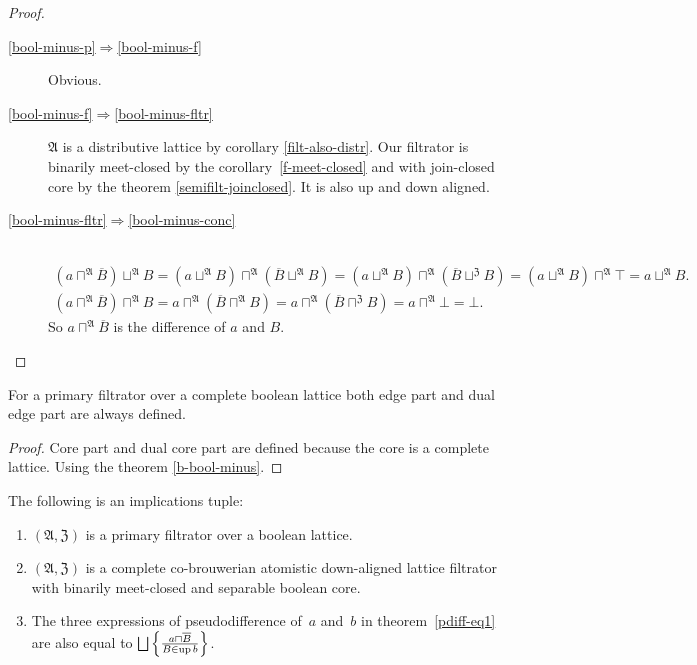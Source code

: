 \begin{proof}
~
\begin{description}
\item [{\ref{bool-minus-p}$\Rightarrow$\ref{bool-minus-f}}] Obvious.
\item [{\ref{bool-minus-f}$\Rightarrow$\ref{bool-minus-fltr}}] $\mathfrak{A}$
is a distributive lattice by corollary \ref{filt-also-distr}. Our
filtrator is binarily meet-closed by the corollary~\ref{f-meet-closed}
and with join-closed core by the theorem \ref{semifilt-joinclosed}.
It is also up and down aligned.
\item [{\ref{bool-minus-fltr}$\Rightarrow$\ref{bool-minus-conc}}] ~
\begin{gather*}
(a\sqcap^{\mathfrak{A}}\overline{B})\sqcup^{\mathfrak{A}}B=(a\sqcup^{\mathfrak{A}}B)\sqcap^{\mathfrak{A}}(\overline{B}\sqcup^{\mathfrak{A}}B)=(a\sqcup^{\mathfrak{A}}B)\sqcap^{\mathfrak{A}}(\overline{B}\sqcup^{\mathfrak{Z}}B)=(a\sqcup^{\mathfrak{A}}B)\sqcap^{\mathfrak{A}}\top=a\sqcup^{\mathfrak{A}}B.\\
(a\sqcap^{\mathfrak{A}}\overline{B})\sqcap^{\mathfrak{A}}B=a\sqcap^{\mathfrak{A}}(\overline{B}\sqcap^{\mathfrak{A}}B)=a\sqcap^{\mathfrak{A}}(\overline{B}\sqcap^{\mathfrak{Z}}B)=a\sqcap^{\mathfrak{A}}\bot=\bot.
\end{gather*}
So $a\sqcap^{\mathfrak{A}}\overline{B}$ is the difference of $a$
and $B$.
\end{description}
\end{proof}

\begin{prop}
For a primary filtrator over a complete boolean lattice both edge
part and dual edge part are always defined.\end{prop}
\begin{proof}
Core part and dual core part are defined because the core is a complete
lattice. Using the theorem \ref{b-bool-minus}.\end{proof}

\begin{thm}
The following is an implications tuple:
\begin{enumerate}
\item\label{filt-pseud-filt} $(\mathfrak{A}, \mathfrak{Z})$ is a primary filtrator over a boolean lattice.
\item\label{filt-pseud-fltr} $(\mathfrak{A}, \mathfrak{Z})$ is a complete co-brouwerian atomistic
  down-aligned lattice filtrator with binarily meet-closed and separable boolean core.
\item\label{filt-pseud-res} The three expressions of pseudodifference of~$a$ and~$b$ in theorem~\ref{pdiff-eq1} are also equal to
  $\bigsqcup \setcond{ a \sqcap \overline{B} }{ B \in \up b }$.
\end{enumerate}

\end{thm}

